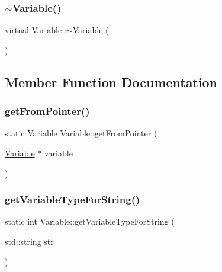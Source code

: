 \subsubsection{\texorpdfstring{$\sim$\+Variable()}{~Variable()}}
{\footnotesize\ttfamily virtual Variable\+::$\sim$\+Variable (\begin{DoxyParamCaption}{ }\end{DoxyParamCaption})\hspace{0.3cm}{\ttfamily [virtual]}}



\subsection{Member Function Documentation}
\mbox{\label{classVariable_a9082f1e84cdaac510ddba4d491d990e0}} 
\subsubsection{\texorpdfstring{get\+From\+Pointer()}{getFromPointer()}}
{\footnotesize\ttfamily static \hyperlink{classVariable}{Variable} Variable\+::get\+From\+Pointer (\begin{DoxyParamCaption}\item[{\hyperlink{classVariable}{Variable} $\ast$}]{variable }\end{DoxyParamCaption})\hspace{0.3cm}{\ttfamily [static]}}

\mbox{\label{classVariable_aa0be16097cea78860a025aeaac8f6d2e}} 
\subsubsection{\texorpdfstring{get\+Variable\+Type\+For\+String()}{getVariableTypeForString()}}
{\footnotesize\ttfamily static int Variable\+::get\+Variable\+Type\+For\+String (\begin{DoxyParamCaption}\item[{std\+::string}]{str }\end{DoxyParamCaption})\hspace{0.3cm}{\ttfamily [static]}}

